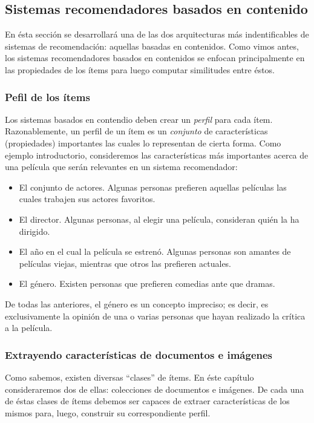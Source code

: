 	\subsection{Sistemas recomendadores basados en contenido}
		
		En ésta sección se desarrollará una de las dos arquitecturas más indentificables de sistemas de recomendación: aquellas basadas en contenidos. Como vimos antes, los sistemas recomendadores basados en contenidos se enfocan principalmente en las propiedades de los ítems para luego computar similitudes entre éstos.
		
		\subsubsection{Pefil de los ítems}
			Los sistemas basados en contendio deben crear un \textit{perfil} para cada ítem. Razonablemente, un perfil de un ítem es un \textit{conjunto} de características (propiedades) importantes las cuales lo representan de cierta forma. Como ejemplo introductorio, consideremos las características más importantes acerca de una película que serán relevantes en un sistema recomendador:
			\begin{itemize}
				\item El conjunto de actores. Algunas personas prefieren aquellas películas las cuales trabajen sus actores favoritos.
				\item El director. Algunas personas, al elegir una película, consideran quién la ha dirigido.
				\item El año en el cual la película se estrenó. Algunas personas son amantes de películas viejas, mientras que otros las prefieren actuales.
				\item El género. Existen personas que prefieren comedias ante que dramas.
			\end{itemize}
			De todas las anteriores, el género es un concepto impreciso; es decir, es exclusivamente la opinión de una o varias personas que  hayan realizado la crítica a la película.
		
		\subsubsection{Extrayendo características de documentos e imágenes}
			Como sabemos, existen diversas \enquote{clases} de ítems. En éste capítulo consideraremos dos de ellas: colecciones de documentos e imágenes. De cada una de éstas clases de ítems debemos ser capaces de extraer características de los mismos para, luego, construir su correspondiente perfil. \par
			
